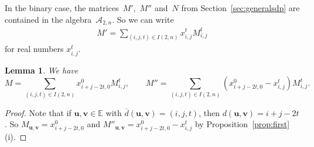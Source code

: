 \documentclass[10pt,a4paper]{article}
\newcommand{\E}{\mathbb{E}}
\newtheorem{lemma}[theorem]{Lemma}
\theoremstyle{definition}
\newcommand{\uu}{\mathbf{u}}
\newcommand{\vv}{\mathbf{v}}
\begin{document}
 In the binary case, the matrices~$M'$,~$M''$ and~$N$ from Section~\ref{sec:generalsdp} are contained in the algebra~$\mathcal{A}_{2,n}$. So we can write
\begin{align}\label{eq:Mprimebinary}
M'= \sum_{(i,j,t) \in I(2,n)} x_{i,j}^t M_{i,j}^t 
\end{align}
for real numbers $x_{i,j}^t$.
\begin{lemma}\label{lem:matricesbinary}
We have 
\[
M=\sum_{(i,j,t)\in I(2,n)} x_{i+j-2t,0}^0 M_{i,j}^t,\qquad M'' =  \sum_{(i,j,t)\in I(2,n)} (x_{i+j-2t,0}^0 - x_{i,j}^t) M_{i,j}^t.
\]
\end{lemma}
\begin{proof}
Note that if $\uu,\vv\in \E$ with $\overline{d}(\uu,\vv)=(i,j,t)$, then $d(\uu,\vv)=i+j-2t$. So $M_{\uu,\vv} = x_{i+j-2t,0}^0$ and $M''_{\uu,\vv} = x_{i+j-2t,0}^0 - x_{i,j}^t$ by Proposition~\ref{prop:first} (i). 
\end{proof}
\end{document}
